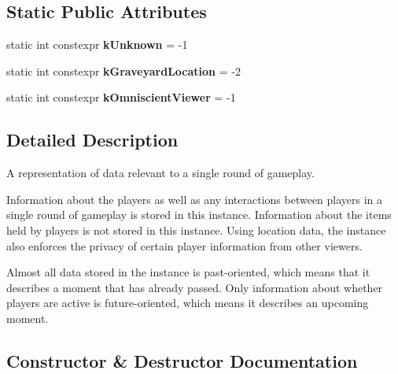 \subsection*{Static Public Attributes}
\begin{DoxyCompactItemize}
\item 
\mbox{\label{classroundinfo_1_1_round_info_a6a7ac5df8cced5aac3c30a98f88df3d9}} 
static int constexpr {\bfseries k\+Unknown} = -\/1
\item 
\mbox{\label{classroundinfo_1_1_round_info_a316f9f9173bcbf923181a84deb70c4d0}} 
static int constexpr {\bfseries k\+Graveyard\+Location} = -\/2
\item 
\mbox{\label{classroundinfo_1_1_round_info_a29eb9d113e033613762e50e1aaf63290}} 
static int constexpr {\bfseries k\+Omniscient\+Viewer} = -\/1
\end{DoxyCompactItemize}


\subsection{Detailed Description}
A representation of data relevant to a single round of gameplay. 

Information about the players as well as any interactions between players in a single round of gameplay is stored in this instance. Information about the items held by players is  not stored in this instance. Using location data, the instance also enforces the privacy of certain player information from other viewers.

Almost all data stored in the instance is past-\/oriented, which means that it describes a moment that has already passed. Only information about whether players are active is future-\/oriented, which means it describes an upcoming moment. 

\subsection{Constructor \& Destructor Documentation}
\mbox{\label{classroundinfo_1_1_round_info_abf54268ebef648dc57353dd2fd6374b5}} 
